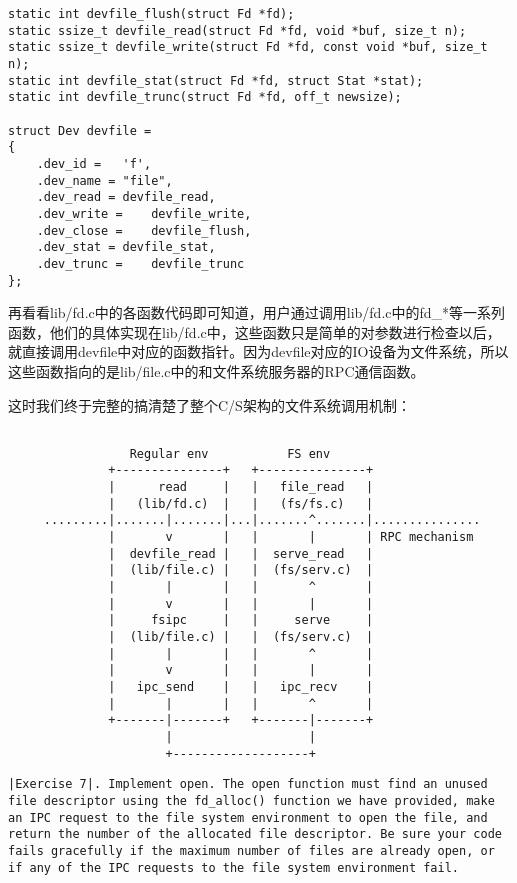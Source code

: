 \documentclass{article}
\begin{document}
\begin{CJK*}{UTF8}{gkai}
\begin{lstlisting}[style=ccode, title={\scriptsize \ttfamily \bfseries lib/file.c}]
static int devfile_flush(struct Fd *fd);
static ssize_t devfile_read(struct Fd *fd, void *buf, size_t n);
static ssize_t devfile_write(struct Fd *fd, const void *buf, size_t n);
static int devfile_stat(struct Fd *fd, struct Stat *stat);
static int devfile_trunc(struct Fd *fd, off_t newsize);

struct Dev devfile =
{
	.dev_id =	'f',
	.dev_name =	"file",
	.dev_read =	devfile_read,
	.dev_write =	devfile_write,
	.dev_close =	devfile_flush,
	.dev_stat =	devfile_stat,
	.dev_trunc =	devfile_trunc
};
\end{lstlisting}


再看看lib/fd.c中的各函数代码即可知道，用户通过调用lib/fd.c中的fd\_*等一系列函数，他们的具体实现在lib/fd.c中，这些函数只是简单的对参数进行检查以后，就直接调用devfile中对应的函数指针。因为devfile对应的IO设备为文件系统，所以这些函数指向的是lib/file.c中的和文件系统服务器的RPC通信函数。


这时我们终于完整的搞清楚了整个C/S架构的文件系统调用机制：

{ \footnotesize
\begin{verbatim}

                 Regular env           FS env
              +---------------+   +---------------+
              |      read     |   |   file_read   |
              |   (lib/fd.c)  |   |   (fs/fs.c)   |
     .........|.......|.......|...|.......^.......|...............
              |       v       |   |       |       | RPC mechanism
              |  devfile_read |   |  serve_read   |
              |  (lib/file.c) |   |  (fs/serv.c)  |
              |       |       |   |       ^       |
              |       v       |   |       |       |
              |     fsipc     |   |     serve     |
              |  (lib/file.c) |   |  (fs/serv.c)  |
              |       |       |   |       ^       |
              |       v       |   |       |       |
              |   ipc_send    |   |   ipc_recv    |
              |       |       |   |       ^       |
              +-------|-------+   +-------|-------+
                      |                   |
                      +-------------------+
\end{verbatim}
}

\newpage

\begin{lstlisting}[style=exercise]
|Exercise 7|. Implement open. The open function must find an unused file descriptor using the fd_alloc() function we have provided, make an IPC request to the file system environment to open the file, and return the number of the allocated file descriptor. Be sure your code fails gracefully if the maximum number of files are already open, or if any of the IPC requests to the file system environment fail.


\end{lstlisting}
\end{CJK*}
\end{document}
